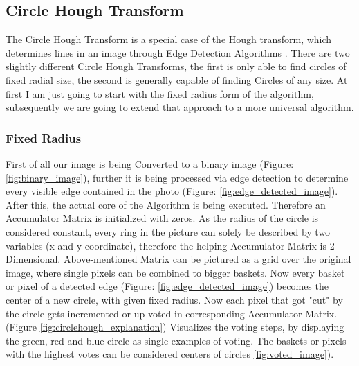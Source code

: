 \subsection{Circle Hough Transform}
The Circle Hough Transform is a special case of the Hough transform, which determines lines in an image through Edge Detection Algorithms \cite{circlehough}. There are two slightly different Circle Hough Transforms, the first is only able to find circles of fixed radial size, the second is generally capable of finding Circles of any size. At first I am just going to start with the fixed radius form of the algorithm, subsequently we are going to extend that approach to a more universal algorithm.

\subsubsection{Fixed Radius}
First of all our image is being Converted to a binary image  (Figure: \ref{fig:binary_image}), further it is being processed via edge detection to determine every visible edge contained in the photo (Figure: \ref{fig:edge_detected_image}).
After this, the actual core of the Algorithm is being executed. Therefore an Accumulator Matrix is initialized with zeros. As the radius of the circle is considered constant, every ring in the picture can solely be described by two variables (x and y coordinate), therefore the helping Accumulator Matrix is 2-Dimensional.
Above-mentioned Matrix can be pictured as a grid over the original image, where single pixels can be combined to bigger baskets. Now every basket or pixel of a detected edge (Figure: \ref{fig:edge_detected_image}) becomes the center of a new circle, with given fixed radius. Now each pixel that got "cut" by the circle gets incremented or up-voted in corresponding Accumulator Matrix. (Figure \ref{fig:circlehough_explanation}) Visualizes the voting steps, by displaying the green, red and blue circle as single examples of voting. The baskets or pixels with the highest votes can be considered centers of circles \ref{fig:voted_image}).
\newline

